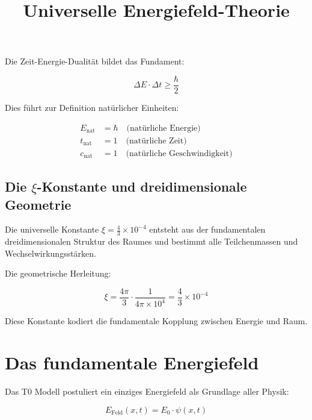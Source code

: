 \documentclass[12pt,a4paper]{report}
\begin{document}
	Die Zeit-Energie-Dualität bildet das Fundament:
	
	\begin{equation}
		\Delta E \cdot \Delta t \geq \frac{\hbar}{2}
	\end{equation}
	
	Dies führt zur Definition natürlicher Einheiten:
	
	\begin{align}
		E_{\text{nat}} &= \hbar \quad \text{(natürliche Energie)} \\
		t_{\text{nat}} &= 1 \quad \text{(natürliche Zeit)} \\
		c_{\text{nat}} &= 1 \quad \text{(natürliche Geschwindigkeit)}
	\end{align}
	
	\subsection{Die $\xi$-Konstante und dreidimensionale Geometrie}
	
	\begin{erkenntnis}
		Die universelle Konstante $\xi = \frac{4}{3} \times 10^{-4}$ entsteht aus der fundamentalen dreidimensionalen Struktur des Raumes und bestimmt alle Teilchenmassen und Wechselwirkungsstärken.
	\end{erkenntnis}
	
	Die geometrische Herleitung:
	
	\begin{equation}
		\xi = \frac{4\pi}{3} \cdot \frac{1}{4\pi \times 10^4} = \frac{4}{3} \times 10^{-4}
	\end{equation}
	
	Diese Konstante kodiert die fundamentale Kopplung zwischen Energie und Raum.
	
	\title{Universelle Energiefeld-Theorie}
\maketitle
	
	\section{Das fundamentale Energiefeld}
	
	Das T0 Modell postuliert ein einziges Energiefeld als Grundlage aller Physik:
	
	\begin{equation}
		E_{\text{Feld}}(x,t) = E_0 \cdot \psi(x,t)
	\end{equation}
	
\end{document}
